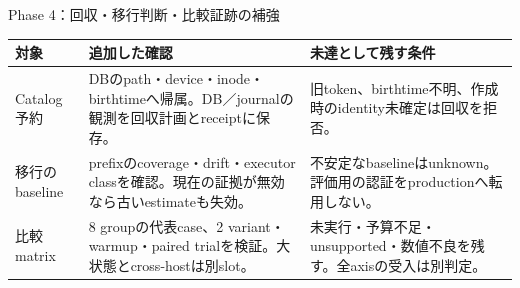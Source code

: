 \begin{frame}{Phase 4：回収・移行判断・比較証跡の補強}
  \small
  \begin{tabularx}{\textwidth}{@{}p{}XX@{}}
    \toprule 対象 & 追加した確認 & 未達として残す条件 \\
    \midrule
    Catalog予約 & DBのpath・device・inode・birthtimeへ帰属。DB／journalの観測を回収計画とreceiptに保存。 & 旧token、birthtime不明、作成時のidentity未確定は回収を拒否。 \\
    \addlinespace
    移行のbaseline & prefixのcoverage・drift・executor classを確認。現在の証拠が無効なら古いestimateも失効。 & 不安定なbaselineはunknown。評価用の認証をproductionへ転用しない。 \\
    \addlinespace
    比較matrix & 8 groupの代表case、2 variant・warmup・paired trialを検証。大状態とcross-hostは別slot。 & 未実行・予算不足・unsupported・数値不良を残す。全axisの受入は別判定。 \\
    \bottomrule
  \end{tabularx}
  \medskip
\end{frame}

